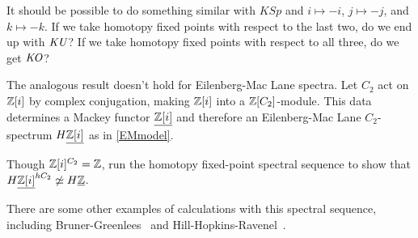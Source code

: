 \begin{ques}
It should be possible to do something similar with $\mathit{KSp}$ and $i\mapsto -i$, $j\mapsto -j$, and $k\mapsto
-k$. If we take homotopy fixed points with respect to the last two, do we end up with $\mathit{KU}$? If we take homotopy
fixed points with respect to all three, do we get $\mathit{KO}$?
\end{ques}
\begin{ex}
The analogous result doesn't hold for Eilenberg-Mac Lane spectra. Let $C_2$ act on $\mathbb Z[i]$ by complex conjugation,
making $\mathbb Z[i]$ into a $\mathbb Z[C_2]$-module. This data determines a Mackey functor $\underline{\mathbb Z[i]}$ and therefore an
Eilenberg-Mac Lane $C_2$-spectrum $H\underline{\mathbb Z[i]}$ as in \cref{EMmodel}.

Though $\mathbb Z[i]^{C_2} = \mathbb Z$, run the homotopy fixed-point spectral sequence to show that
$H\underline{\mathbb Z[i]}^{hC_2}\not\simeq H\underline{\mathbb Z}$.
\end{ex}
There are some other examples of calculations with this spectral sequence, including Bruner-Greenlees~\cite{BG10}
and Hill-Hopkins-Ravenel~\cite{HHREO2, HHR}.
